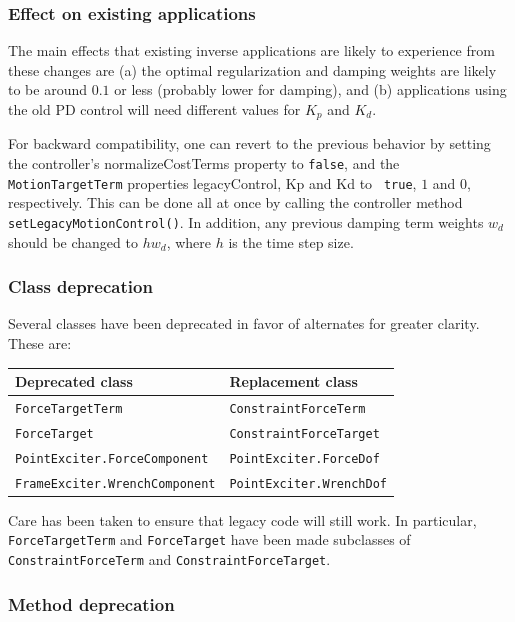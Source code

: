 \documentclass{article}
\begin{document}
\subsubsection{Effect on existing applications}

The main effects that existing inverse applications are likely to experience
from these changes are (a) the optimal regularization and damping weights are
likely to be around $0.1$ or less (probably lower for damping), and (b)
applications using the old PD control will need different values for $K_p$ and
$K_d$.

For backward compatibility, one can revert to the previous behavior by setting
the controller's {\sf normalizeCostTerms} property to {\tt false}, and the {\tt
MotionTargetTerm} properties {\sf legacyControl}, {\sf Kp} and {\sf Kd} to {\tt
true}, $1$ and $0$, respectively. This can be done all at once by calling the
controller method {\tt setLegacyMotionControl()}. In addition, any previous
damping term weights $w_d$ should be changed to $h w_d$, where $h$ is the time
step size.

\subsubsection{Class deprecation}

Several classes have been deprecated in favor of alternates for greater
clarity.  These are:

\begin{center}
\begin{tabular}{ll}
\hline
Deprecated class & Replacement class\\
\hline
{\tt ForceTargetTerm} & {\tt ConstraintForceTerm} \\
{\tt ForceTarget} & {\tt ConstraintForceTarget} \\
{\tt PointExciter.ForceComponent} & {\tt PointExciter.ForceDof} \\
{\tt FrameExciter.WrenchComponent} & {\tt PointExciter.WrenchDof} \\
\hline
\end{tabular}
\end{center}

Care has been taken to ensure that legacy code will still work. In particular,
{\tt ForceTargetTerm} and {\tt ForceTarget} have been made subclasses of {\tt
ConstraintForceTerm} and {\tt ConstraintForceTarget}.

\subsubsection{Method deprecation}
\end{document}
